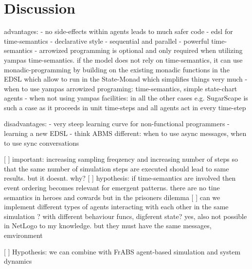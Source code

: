 \section{Discussion}

advantages:
	- no side-effects within agents leads to much safer code
	- edsl for time-semantics
	- declarative style
	- sequential and parallel
	- powerful time-semantics
	- arrowized programming is optional and only required when utilizing yampas time-semantics. if the model does not rely on time-semantics, it can use monadic-programming by building on the existing monadic functions in the EDSL which allow to run in the State-Monad which simplifies things very much
	- when to use yampas arrowized programing: time-semantics, simple state-chart agents 
	- when not using yampas facilities: in all the other cases e.g. SugarScape is such a case as it proceeds in unit time-steps and all agents act in every time-step
	
disadvantages:
	- very steep learning curve for non-functional programmers
	- learning a new EDSL
	- think ABMS different: when to use async messages, when to use sync conversations


[ ] important: increasing sampling freqzency and increasing number of steps so that the same number of simulation steps are executed should lead to same results. but it doesnt. why?
[ ] hypothesis: if time-semantics are involved then event ordering becomes relevant for emergent patterns. there are no tine semantics in heroes and cowards but in the prisoners dilemma
[ ] can we implement different types of agents interacting with each other in the same simulation ? with different behaviour funcs, digferent state? yes, also not possible in NetLogo to my knowledge. but they must have the same messages, emvironment 

[ ] Hypothesis: we can combine with FrABS agent-based simulation and system dynamics